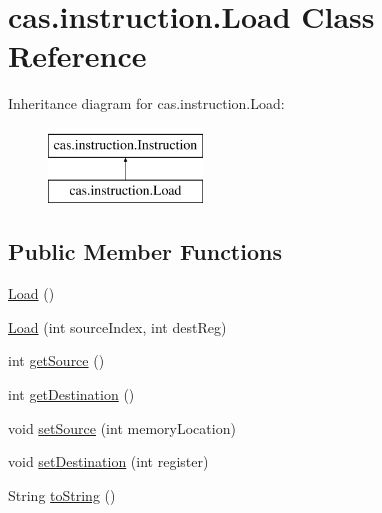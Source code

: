 \hypertarget{classcas_1_1instruction_1_1_load}{\section{cas.\-instruction.\-Load Class Reference}
\label{classcas_1_1instruction_1_1_load}
}
Inheritance diagram for cas.\-instruction.\-Load\-:\begin{figure}[H]
\begin{center}
\leavevmode
\includegraphics[height=2.000000cm]{classcas_1_1instruction_1_1_load}
\end{center}
\end{figure}
\subsection*{Public Member Functions}
\begin{DoxyCompactItemize}
\item 
\hyperlink{classcas_1_1instruction_1_1_load_afe769ce60f78ad457927170eb1202d00}{Load} ()
\item 
\hyperlink{classcas_1_1instruction_1_1_load_a545861724500b0c966383a784b11c5d9}{Load} (int source\-Index, int dest\-Reg)
\item 
int \hyperlink{classcas_1_1instruction_1_1_load_a0370a97cbe673be91a14ec3ff0f80a28}{get\-Source} ()
\item 
int \hyperlink{classcas_1_1instruction_1_1_load_a77a27b4e046a19c645769fd7aae122c2}{get\-Destination} ()
\item 
void \hyperlink{classcas_1_1instruction_1_1_load_a145a282bb473f1463d0845295d195ccc}{set\-Source} (int memory\-Location)
\item 
void \hyperlink{classcas_1_1instruction_1_1_load_abcd647e5b9c359bd13b1e057c761c95b}{set\-Destination} (int register)
\item 
String \hyperlink{classcas_1_1instruction_1_1_load_a0c7010f91ddc278fe1a84522af6ffb66}{to\-String} ()
\end{DoxyCompactItemize}


